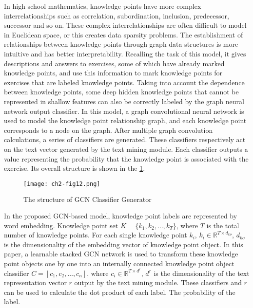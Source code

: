 In high school mathematics, knowledge points have more complex interrelationships such as correlation, subordination, inclusion, predecessor, successor and so on. These complex interrelationships are often difficult to model in Euclidean space, or this creates data sparsity problems. The establishment of relationships between knowledge points through graph data structures is more intuitive and has better interpretability. Recalling the task of this model, it gives descriptions and answers to exercises, some of which have already marked knowledge points, and use this information to mark knowledge points for exercises that are labeled knowledge points. Taking into account the dependence between knowledge points, some deep hidden knowledge points that cannot be represented in shallow features can also be correctly labeled by the graph neural network output classifier. In this model, a graph convolutional neural network is used to model the knowledge point relationship graph, and each knowledge point corresponds to a node on the graph. After multiple graph convolution calculations, a series of classifiers are generated. These classifiers respectively act on the text vector generated by the text mining module. Each classifier outputs a value representing the probability that the knowledge point is associated with the exercise. Its overall structure is shown in the \figurename{\ref{fig:ch2-fig12}}.

\begin{figure}[h]
	\centering
	\texttt{[image: ch2-fig12.png]}
	\caption{The structure of GCN Classifier Generator}\label{fig:ch2-fig12}
\end{figure}

In the proposed GCN-based model, knowledge point labels are represented by word embedding. Knowledge point set \(K=\{k_1,k_2,\ldots,k_T\} \), where \(T\) is the total number of knowledge points. For each single knowledge point \(k_i\), \(k_i \in \mathbb{R}^{T\times d_{ko}}\), \(d_{ko}\) is the dimensionality of the embedding vector of knowledge point object. In this paper, a learnable stacked GCN network is used to transform these knowledge point objects one by one into an internally connected knowledge point object classifier \(C=[c_1,c_2,\ldots,c_n]\), where \(c_i\in\mathbb {R}^{T\times d^r}\), \(d^r\) is the dimensionality of the text representation vector \(r\) output by the text mining module. These classifiers and \(r\) can be used to calculate the dot product of each label. The probability of the label.

